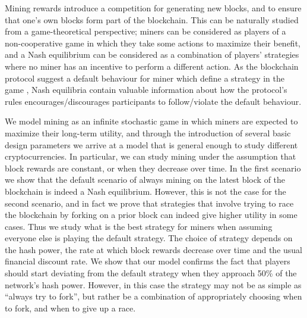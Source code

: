 \smallskip
{} Mining rewards introduce a competition for generating new blocks, and to ensure that one's own blocks form part of the blockchain. This can be naturally studied from a game-theoretical perspective; miners can be considered as players of a non-cooperative game in which they take some actions to maximize their benefit, and a Nash equilibrium can be considered as a combination of players' strategies where no miner has an incentive to perform a different action. As the blockchain protocol suggest a default behaviour for miner which define a strategy in the game , Nash equilibria contain valuable information about how the protocol's rules encourages/discourages participants to follow/violate the default behaviour. 

We model mining as an infinite stochastic game in which miners are expected to maximize their long-term utility, and through the introduction of several 
basic design parameters we arrive at a model that is general enough to study different cryptocurrencies. In particular, we can study mining under the assumption that block rewards are constant, or when they decrease over time. In the first scenario we show that 
the default scenario of always mining on the latest block of the blockchain is indeed a Nash equilibrium. However, this is not the case for the second scenario, and in fact we 
prove that strategies that involve trying to race the blockchain by forking on a prior block can indeed give higher utility in some cases. Thus we study 
what is the best strategy for miners when assuming everyone else is playing the default strategy. The choice of strategy depends on the hash power, the rate at which 
block rewards decrease over time and the usual financial discount rate. We show that our model confirms the fact that players should start deviating from the default strategy 
when they approach 50\% of the network's hash power. However, in this case the strategy may not be as simple as ``always try to fork'', but rather be a combination 
of appropriately choosing when to fork, and when to give up a race. 



